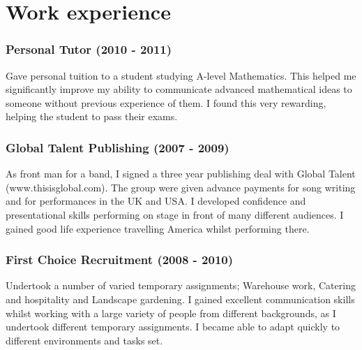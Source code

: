 \documentclass[11pt]{article}
\begin{document}
\section*{Work experience}
\subsubsection*{Personal Tutor (2010 - 2011)}
Gave personal tuition to a student studying A-level Mathematics. This helped me significantly improve my ability to communicate advanced mathematical ideas to someone without previous experience of them. I found this very rewarding, helping the student to pass their exams.    
\subsubsection*{Global Talent Publishing (2007 - 2009)}
As front man for a band, I signed a three year publishing deal with Global Talent (www.thisisglobal.com). The group were given advance payments for song writing and for performances in the UK and USA. I developed confidence and presentational skills performing on stage in front of many different audiences. I gained good life experience travelling America whilst performing there.
\subsubsection*{First Choice Recruitment (2008 - 2010)}
Undertook a number of varied temporary assignments; Warehouse work, Catering and hospitality and Landscape gardening. I gained excellent communication skills whilst working with a large variety of people from different backgrounds, as I undertook different temporary assignments. I became able to adapt quickly to different environments and tasks set.
\end{document}
